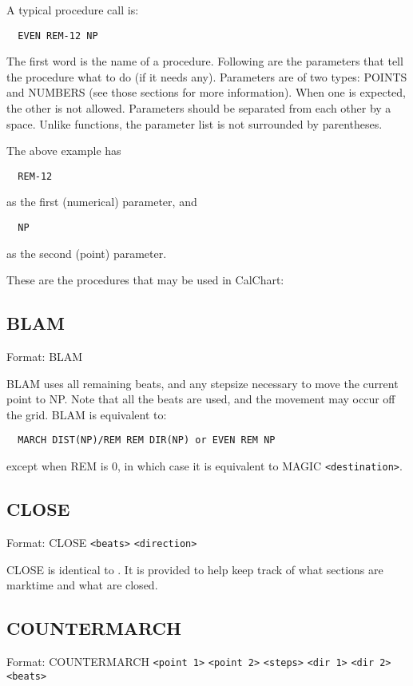 A typical procedure call is:
\begin{verbatim}
  EVEN REM-12 NP
\end{verbatim}
The first word is the name of a procedure.  Following are the parameters
that tell the procedure what to do (if it needs any).  Parameters are of
two types: POINTS and NUMBERS (see those sections for more information).
When one is expected, the other is not allowed.  Parameters should be
separated from each other by a space.  Unlike functions, the parameter list
is not surrounded by parentheses.

The above example has
\begin{verbatim}
  REM-12
\end{verbatim}
as the first (numerical) parameter, and
\begin{verbatim}
  NP
\end{verbatim}
as the second (point) parameter.

These are the procedures that may be used in CalChart:

\subsection{BLAM}\label{blam}

Format: BLAM

BLAM uses all remaining beats, and any stepsize necessary to move the current
point to NP.  Note that all the beats are used, and the movement
may occur off the grid.  BLAM is equivalent to:
\begin{verbatim}
  MARCH DIST(NP)/REM REM DIR(NP) or EVEN REM NP
\end{verbatim}
except when REM is 0, in which case it is equivalent to
MAGIC \verb$<destination>$.

\subsection{CLOSE}\label{close}

Format: CLOSE \verb$<beats>$ \verb$<direction>$

CLOSE is identical to .  It is provided to help keep track
of what sections are marktime and what are closed.

\subsection{COUNTERMARCH}\label{countermarch}

Format: COUNTERMARCH \verb$<point 1>$ \verb$<point 2>$ \verb$<steps>$ \verb$<dir 1>$ \verb$<dir 2>$ \verb$<beats>$

